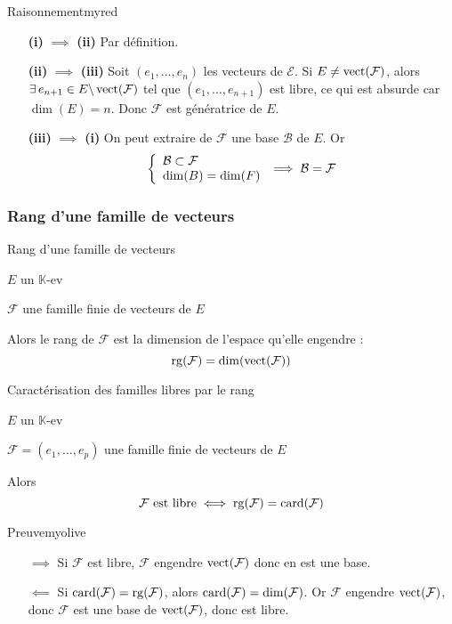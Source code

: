     \begin{demo}{Raisonnement}{myred}
        \begin{itemize}[leftmargin=3cm]
            \item[\textbf{(i)} $\implies$ \textbf{(ii)}] Par définition.
            \item[\textbf{(ii)} $\implies$ \textbf{(iii)}] Soit $(e_1,\ldots,e_n)$ les vecteurs de $\mathcal{E}$. Si $E \neq \operatorname{vect}(\mathcal{F})$, alors $\exists \, e_{n+1} \in E \backslash \operatorname{vect}(\mathcal{F})$ tel que $(e_1,\ldots,e_{n+1})$ est libre, ce qui est absurde car $\dim(E) = n$. Donc $\mathcal{F}$ est génératrice de $E$.
            \item[\textbf{(iii)} $\implies$ \textbf{(i)}] On peut extraire de $\mathcal{F}$ une base $\mathcal{B}$ de $E$. Or \[ \et{\mathcal{B} \subset \mathcal{F}}{\dim(B) = \dim(F)} \implies \mathcal{B} = \mathcal{F} \]
        \end{itemize}
    \end{demo}

    \subsubsection{Rang d’une famille de vecteurs}

    \begin{defi}{Rang d’une famille de vecteurs}{}
        \begin{soient}
            \item $E$ un $\mathbb{K}$-ev
            \item $\mathcal{F}$ une famille finie de vecteurs de $E$
        \end{soient}
        Alors le rang de $\mathcal{F}$ est la dimension de l’espace qu’elle engendre :
        \[ \operatorname{rg}(\mathcal{F}) = \dim(\operatorname{vect}(\mathcal{F})) \]
    \end{defi}

    \begin{prop}{Caractérisation des familles libres par le rang}{}
        \begin{soient}
            \item $E$ un $\mathbb{K}$-ev
            \item $\mathcal{F} = (e_1,\ldots,e_p)$ une famille finie de vecteurs de $E$
        \end{soient}
        Alors \[ \mathcal{F} \text{ est libre} \iff \operatorname{rg}(\mathcal{F}) = \operatorname{card}(\mathcal{F}) \]
    \end{prop}
    
    \begin{demo}{Preuve}{myolive}
        \begin{itemize}
            \item[$\implies$] Si $\mathcal{F}$ est libre, $\mathcal{F}$ engendre $\operatorname{vect}(\mathcal{F})$ donc en est une base.
            \item[$\impliedby$] Si $\operatorname{card}(\mathcal{F}) = \operatorname{rg}(\mathcal{F})$, alors $\operatorname{card}(\mathcal{F}) = \dim(\mathcal{F})$. Or $\mathcal{F}$ engendre $\operatorname{vect}(\mathcal{F})$, donc $\mathcal{F}$ est une base de $\operatorname{vect}(\mathcal{F})$, donc est libre. 
        \end{itemize}
    \end{demo}

